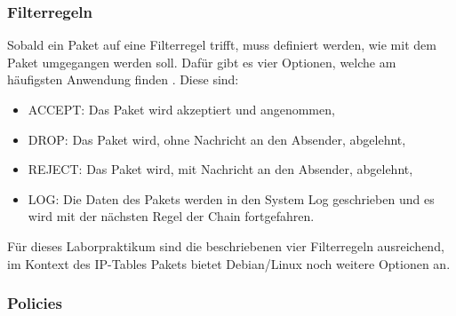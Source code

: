 \documentclass[
a4paper,     %
 headsepline, %
footsepline, %
titlepage,   %
 halfparskip,     %
 fleqn,       %
12pt         %
]{scrartcl}  %
\begin{document}
\begin{table}[!h]
\centering
{}
\caption{IP-Tables: Chains}
\label{IP-Tables: Chains}
\end{table}

\subsubsection{Filterregeln}
Sobald ein Paket auf eine Filterregel trifft, muss definiert werden, wie mit dem Paket umgegangen werden soll. Dafür gibt es vier Optionen, welche am häufigsten Anwendung finden \cite{iptables-1}. Diese sind:
\begin{itemize}

\item ACCEPT: Das Paket wird akzeptiert und angenommen,
\item DROP: Das Paket wird, ohne Nachricht an den Absender, abgelehnt,
\item REJECT: Das Paket wird, mit Nachricht an den Absender, abgelehnt,
\item LOG: Die Daten des Pakets werden in den System Log geschrieben und es wird mit der nächsten Regel der Chain fortgefahren. 

\end{itemize}

Für dieses Laborpraktikum sind die beschriebenen vier Filterregeln ausreichend, im Kontext des IP-Tables Pakets bietet Debian/Linux noch weitere Optionen an. 
 
\subsubsection{Policies}
\end{document}
